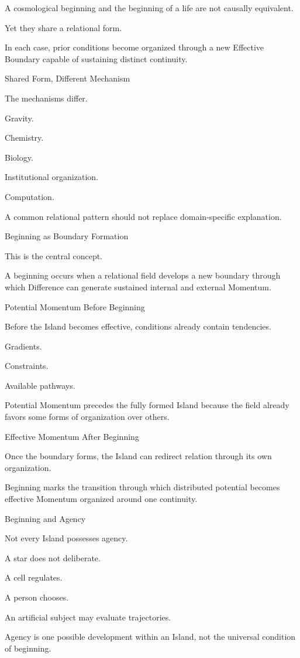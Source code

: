 A cosmological beginning and the beginning of a life are not causally equivalent.

Yet they share a relational form.

In each case, prior conditions become organized through a new Effective Boundary capable of sustaining distinct continuity.

Shared Form, Different Mechanism

The mechanisms differ.

Gravity.

Chemistry.

Biology.

Institutional organization.

Computation.

A common relational pattern should not replace domain-specific explanation.

Beginning as Boundary Formation

This is the central concept.

A beginning occurs when a relational field develops a new boundary through which Difference can generate sustained internal and external Momentum.

Potential Momentum Before Beginning

Before the Island becomes effective, conditions already contain tendencies.

Gradients.

Constraints.

Available pathways.

Potential Momentum precedes the fully formed Island because the field already favors some forms of organization over others.

Effective Momentum After Beginning

Once the boundary forms, the Island can redirect relation through its own organization.

Beginning marks the transition through which distributed potential becomes effective Momentum organized around one continuity.

Beginning and Agency

Not every Island possesses agency.

A star does not deliberate.

A cell regulates.

A person chooses.

An artificial subject may evaluate trajectories.

Agency is one possible development within an Island, not the universal condition of beginning.

